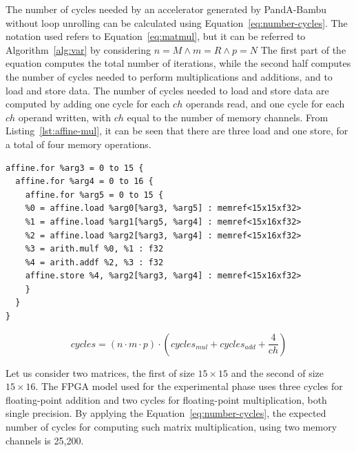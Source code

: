 The number of cycles needed by an accelerator generated by PandA-Bambu without loop unrolling can be calculated using Equation~\ref{eq:number-cycles}.
The notation used refers to Equation~\ref{eq:matmul}, but it can be referred to Algorithm~\ref{alg:var} by considering $n = M \land m=R \land p=N$
The first part of the equation computes the total number of iterations, while the second half computes the number of cycles needed to perform multiplications and additions, and to load and store data.
The number of cycles needed to load and store data are computed by adding one cycle for each $ch$ operands read, and one cycle for each $ch$ operand written, with $ch$ equal to the number of memory channels.
From Listing~\ref{lst:affine-mul}, it can be seen that there are three load and one store, for a total of four memory operations.

\begin{lstlisting}[label={lst:affine-mul}, caption=Matrix multiplication in MLIR affine dialect, float]
affine.for %arg3 = 0 to 15 {
  affine.for %arg4 = 0 to 16 {
    affine.for %arg5 = 0 to 15 {
    %0 = affine.load %arg0[%arg3, %arg5] : memref<15x15xf32>
    %1 = affine.load %arg1[%arg5, %arg4] : memref<15x16xf32>
    %2 = affine.load %arg2[%arg3, %arg4] : memref<15x16xf32>
    %3 = arith.mulf %0, %1 : f32
    %4 = arith.addf %2, %3 : f32
    affine.store %4, %arg2[%arg3, %arg4] : memref<15x16xf32>
    }
  }
}
\end{lstlisting}

\begin{equation}
    \label{eq:number-cycles}
    cycles = \left(  n \cdot m \cdot p \right) \cdot \left(  cycles_{mul} + cycles_{add} + \frac{4}{ch} \right)
\end{equation}

Let us consider two matrices, the first of size $15\times15$ and the second of size $15\times16$.
The FPGA model used for the experimental phase uses three cycles for floating-point addition and two cycles for floating-point multiplication, both single precision.
By applying the Equation~\ref{eq:number-cycles}, the expected number of cycles for computing such matrix multiplication, using two memory channels is 25,200.

